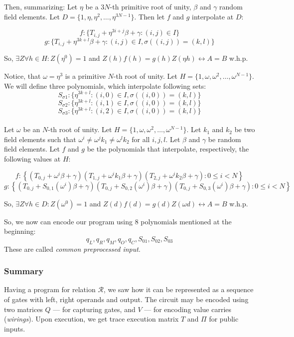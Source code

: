 \documentclass[../lecture-notes.tex]{subfiles}
\begin{document}
Then, summarizing:
Let $\eta$ be a $3N$-th primitive root of unity, $\beta$ and $\gamma$ random field elements. Let $D = \{1, \eta, \eta^2, \ldots, \eta^{3N-1}\}$. Then let $f$ and $g$ interpolate at $D$:

\[f: \{T_{i,j} + \eta^{3i+j}\beta + \gamma : (i, j) \in I\}\]
\[g: \{T_{i,j} + \eta^{3k+l}\beta + \gamma : (i, j) \in I, \sigma((i, j)) = (k, l)\}\]

So, \(\exists Z \forall h \in H: Z(\eta^{0}) = 1\) and  \(Z(h)f(h) = g(h)Z(\eta h) \leftrightarrow A = B\) w.h.p.

Notice, that $\omega = \eta^3$ is a primitive $N$-th root of unity. Let \(H = \{1, \omega, \omega^2, \ldots, \omega^{N-1}\}\). 
We will define three polynomials, which interpolate following sets:
\[S_{\sigma 1}: \{\eta^{3k+l} : (i, 0) \in I, \sigma((i, 0)) = (k, l)\}\]
\[S_{\sigma 2}: \{\eta^{3k+l} : (i, 1) \in I, \sigma((i, 0)) = (k, l)\}\]
\[S_{\sigma 3}: \{\eta^{3k+l} : (i, 2) \in I, \sigma((i, 0)) = (k, l)\}\]
\\
Let $\omega$ be an $N$-th root of unity. Let $H = \{1, \omega, \omega^2, \ldots, \omega^{N-1}\}$. Let $k_1$ and $k_2$ be two field elements such that $\omega^i \neq \omega^j k_1 \neq \omega^l k_2$ for all $i, j, l$. Let $\beta$ and $\gamma$ be random field elements. Let $f$ and $g$ be the polynomials that interpolate, respectively, the following values at $H$:

\[f: \left\{\left(T_{0,j} + \omega^i \beta + \gamma\right)\left(T_{1,j} + \omega^i k_1 \beta + \gamma\right)\left(T_{2,j} + \omega^i k_2 \beta + \gamma\right) : 0 \leq i < N\right\}\]
\[g: \left\{\left(T_{0,j} + S_{0,1}(\omega^i) \beta + \gamma\right)\left(T_{0,j} + S_{0,2}(\omega^i) \beta + \gamma\right)\left(T_{0,j} + S_{0,3}(\omega^i) \beta + \gamma\right) : 0 \leq i < N\right\}\]

So, \(\exists Z \forall h \in D: Z(\omega^{0}) = 1\) and  \(Z(d)f(d) = g(d)Z(\omega d) \leftrightarrow A = B\) w.h.p.

So, we now can encode our program using 8 polynomials mentioned at the beginning:
\[q_L, q_R, q_M, q_O, q_C, S_{01}, S_{02}, S_{03}\]
These are called \textit{common preprocessed input}.

\subsubsection{Summary}
Having a program for relation $\mathcal{R}$, we saw how it can be represented as
a sequence of gates with left, right operands and output. The circuit may be
encoded using two matrices $Q$ --- for capturing gates, and $V$ --- for encoding
value carries (\textit{wirings}). Upon execution, we get trace execution matrix
$T$ and $\Pi$ for public inputs.
\end{document}
